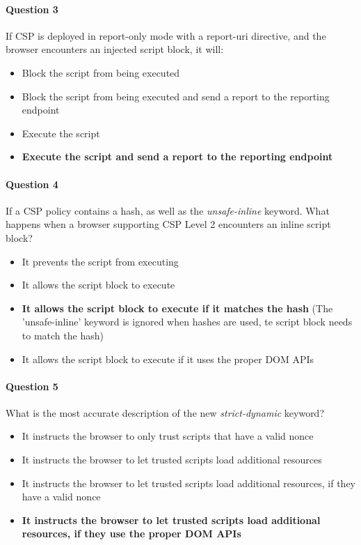 \documentclass[titlepage]{article}
\begin{document}
    \paragraph{Question 3} If CSP is deployed in report-only mode with a report-uri directive, and the browser encounters an injected script block, it will:
    \begin{itemize}
        \item Block the script from being executed
        \item Block the script from being executed and send a report to the reporting endpoint
        \item Execute the script
        \item \textbf{Execute the script and send a report to the reporting endpoint} \checkmark
    \end{itemize}
    \paragraph{Question 4} If a CSP policy contains a hash, as well as the \textit{unsafe-inline} keyword. What happens when a browser supporting CSP Level 2 encounters an inline script block?
    \begin{itemize}
        \item It prevents the script from executing
        \item It allows the script block to execute
        \item \textbf{It allows the script block to execute if it matches the hash} \checkmark (The 'unsafe-inline' keyword is ignored when hashes are used, te script block needs to match the hash)
        \item It allows the script block to execute if it uses the proper DOM APIs
    \end{itemize}
    \paragraph{Question 5} What is the most accurate description of the new \textit{strict-dynamic} keyword?
    \begin{itemize}
        \item It instructs the browser to only trust scripts that have a valid nonce
        \item It instructs the browser to let trusted scripts load additional resources
        \item It instructs the browser to let trusted scripts load additional resources, if they have a valid nonce
        \item \textbf{It instructs the browser to let trusted scripts load additional resources, if they use the proper DOM APIs} \checkmark
    \end{itemize}
\end{document}
